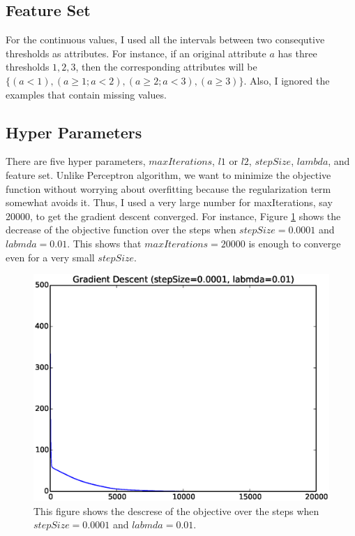 \subsection*{Feature Set}
For the continuous values, I used all the intervals between two consequtive thresholds as attributes. For instance, if an original attribute $a$ has three thresholds ${1, 2, 3}$, then the corresponding attributes will be $\{(a<1),(a\ge 1; a<2),(a\ge 2; a<3),(a\ge 3)\}$. Also, I ignored the examples that contain missing values.

\subsection*{Hyper Parameters}
There are five hyper parameters, $maxIterations$, $l1$ or $l2$, $stepSize$, $lambda$, and feature set. Unlike Perceptron algorithm, we want to minimize the objective function without worrying about overfitting because the regularization term somewhat avoids it. Thus, I used a very large number for maxIterations, say 20000, to get the gradient descent converged. For instance, Figure \ref{fig:gradient_descent} shows the decrease of the objective function over the steps when $stepSize=0.0001$ and $labmda=0.01$. This shows that $maxIterations=20000$ is enough to converge even for a very small $stepSize$.

\begin{figure}[hbtp]
\centering
\includegraphics[width=120mm]{gradient_descent}
\caption{This figure shows the descrese of the objective over the steps when $stepSize=0.0001$ and $labmda=0.01$.}
\label{fig:gradient_descent}
\end{figure}

